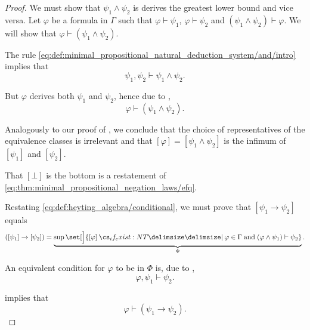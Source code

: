 \begin{proof}
  We must show that \( \psi_1 \wedge \psi_2 \) is derives the greatest lower bound and vice versa. Let \( \varphi \) be a formula in \( \Gamma \) such that \( \varphi \vdash \psi_1 \), \( \varphi \vdash \psi_2 \) and \( (\psi_1 \wedge \psi_2) \vdash \varphi \). We will show that \( \varphi \vdash (\psi_1 \wedge \psi_2) \).

  The rule \eqref{eq:def:minimal_propositional_natural_deduction_system/and/intro} implies that
  \begin{equation*}
    \psi_1, \psi_2 \vdash \psi_1 \wedge \psi_2.
  \end{equation*}

  But \( \varphi \) derives both \( \psi_1 \) and \( \psi_2 \), hence due to ,
  \begin{equation*}
    \varphi \vdash (\psi_1 \wedge \psi_2).
  \end{equation*}

  Analogously to our proof of , we conclude that the choice of representatives of the equivalence classes is irrelevant and that \( [\varphi] = [\psi_1 \wedge \psi_2] \) is the infimum of \( [\psi_1] \) and \( [\psi_2] \).

   That \( [\bot] \) is the bottom is a restatement of \eqref{eq:thm:minimal_propositional_negation_laws/efq}.

   Restating \eqref{eq:def:heyting_algebra/conditional}, we must prove that \( [\psi_1 \rightarrow \psi_2] \) equals
  \begin{equation*}
    ([\psi_1] \rightarrow [\psi_2]) = \underbrace{\sup\set[\Big]{ [\varphi] \given* \varphi \in \Gamma \T{and} (\varphi \wedge \psi_1) \vdash \psi_2 }}_{\Phi}.
  \end{equation*}

  An equivalent condition for \( \varphi \) to be in \( \Phi \) is, due to ,
  \begin{equation*}
    \varphi, \psi_1 \vdash \psi_2.
  \end{equation*}

   implies that
  \begin{equation*}
    \varphi \vdash (\psi_1 \rightarrow \psi_2).
  \end{equation*}


\end{proof}
